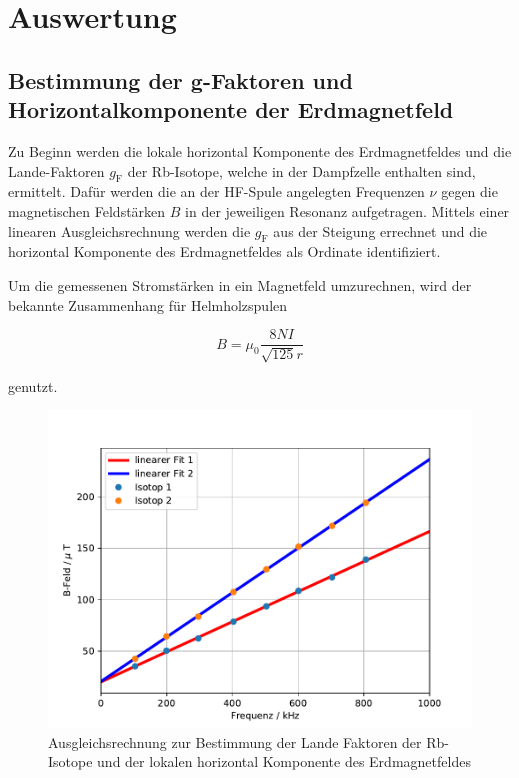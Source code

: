 \section{Auswertung}
\subsection{Bestimmung der g-Faktoren und Horizontalkomponente der Erdmagnetfeld}
Zu Beginn werden die lokale horizontal Komponente des Erdmagnetfeldes und die Lande-Faktoren $g_\text{F}$ der Rb-Isotope, welche in der Dampfzelle enthalten sind, ermittelt.
Dafür werden die an der HF-Spule angelegten Frequenzen $\nu$ gegen die magnetischen Feldstärken $B$ in der jeweiligen Resonanz aufgetragen. Mittels einer linearen Ausgleichsrechnung werden die $g_\text{F}$ aus der Steigung errechnet und die horizontal Komponente des Erdmagnetfeldes als Ordinate identifiziert.

Um die gemessenen Stromstärken in ein Magnetfeld umzurechnen, wird der bekannte Zusammenhang für Helmholzspulen

\begin{equation}
B = \mu_0 \frac{8NI}{\sqrt{125} r}
\end{equation}

genutzt.

\begin{figure}[h]
\centering
\includegraphics[scale=0.8]{img/plotLande.pdf}
\caption{Ausgleichsrechnung zur Bestimmung der Lande Faktoren der Rb-Isotope und der lokalen horizontal Komponente des Erdmagnetfeldes}
\label{abb:gfak}
\end{figure}

